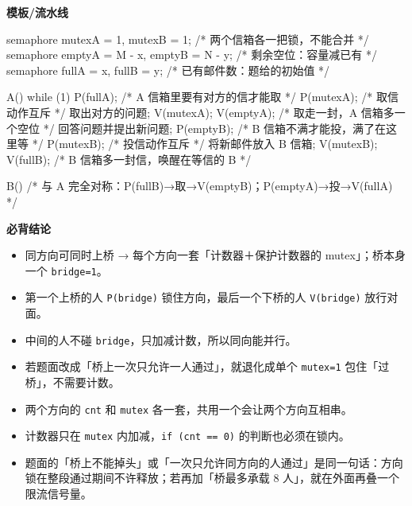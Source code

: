 \documentclass[10pt,a4paper]{ctexart}
\begin{document}
\textbf{模板/流水线}

\begin{codebox}
semaphore mutexA = 1, mutexB = 1;          /* 两个信箱各一把锁，不能合并 */
semaphore emptyA = M - x, emptyB = N - y;  /* 剩余空位：容量减已有 */
semaphore fullA  = x,     fullB  = y;      /* 已有邮件数：题给的初始值 */

A() { while (1) {
    P(fullA);                  /* A 信箱里要有对方的信才能取 */
    P(mutexA);                 /* 取信动作互斥 */
    取出对方的问题;
    V(mutexA);
    V(emptyA);                 /* 取走一封，A 信箱多一个空位 */
    回答问题并提出新问题;
    P(emptyB);                 /* B 信箱不满才能投，满了在这里等 */
    P(mutexB);                 /* 投信动作互斥 */
    将新邮件放入 B 信箱;
    V(mutexB);
    V(fullB);                  /* B 信箱多一封信，唤醒在等信的 B */
} }

B() { /* 与 A 完全对称：P(fullB)→取→V(emptyB)；P(emptyA)→投→V(fullA) */ }
\end{codebox}




\textbf{必背结论}

\begin{itemize}

\item 同方向可同时上桥 → 每个方向一套「计数器＋保护计数器的 mutex」；桥本身一个 \texttt{bridge=1}。

\item 第一个上桥的人 \texttt{P(bridge)} 锁住方向，最后一个下桥的人 \texttt{V(bridge)} 放行对面。

\item 中间的人不碰 \texttt{bridge}，只加减计数，所以同向能并行。

\item 若题面改成「桥上一次只允许一人通过」，就退化成单个 \texttt{mutex=1} 包住「过桥」，不需要计数。

\item 两个方向的 \texttt{cnt} 和 \texttt{mutex} 各一套，共用一个会让两个方向互相串。

\item 计数器只在 \texttt{mutex} 内加减，\texttt{if (cnt == 0)} 的判断也必须在锁内。

\item 题面的「桥上不能掉头」或「一次只允许同方向的人通过」是同一句话：方向锁在整段通过期间不许释放；若再加「桥最多承载 8 人」，就在外面再叠一个限流信号量。

\end{itemize}
\end{document}
